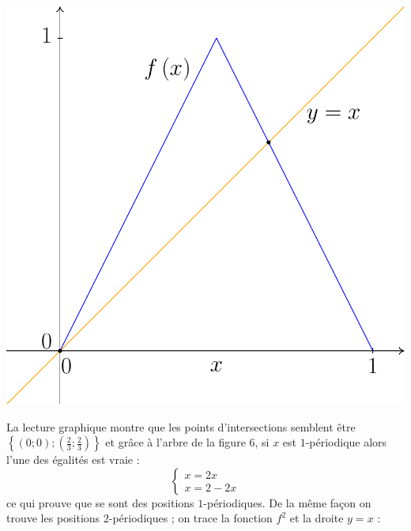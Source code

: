 \documentclass[a4paper,french,12pt]{article}
\begin{document}
\begin{center}
\includegraphics[scale=0.45]{../TeXGraph/Pdf/graphique_etape_1_periode.pdf}
\end{center}

La lecture graphique montre que les points d'intersections semblent être $\left\{\left(0;0\right);\left(\frac{2}{3};\frac{2}{3}\right)\right\}$ et grâce à l'arbre de la figure $6$, si $x$ est $1$-périodique alors l'une des égalités est vraie :
\[\begin{cases}x=2x\\x=2-2x\end{cases}\]
ce qui prouve que se sont des positions $1$-périodiques. De la même façon on trouve les positions $2$-périodiques ; on trace la fonction $f^2$ et la droite $y=x$ :
\end{document}
